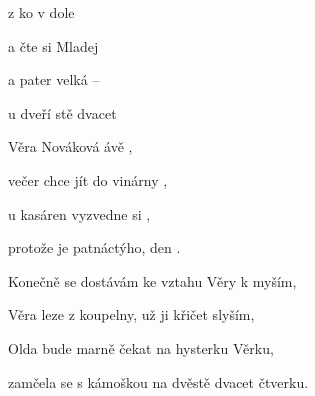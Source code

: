 

\zr
{} z  ko v  
dole 

a čte si  Mladej  

a   pater   velká --

u dveří  stě dvacet 
\kr

\zs
{} Věra Nováková ávě ,

večer chce jít do vinárny  ,

u kasáren vyzvedne si  ,

protože je patnáctýho,  den . 
\ks

\zr \kr

\zs
Konečně se dostávám ke vztahu Věry k myším,

Věra leze z koupelny, už ji křičet slyším,

Olda bude marně čekat na hysterku Věrku,

zamčela se s kámoškou na dvěstě dvacet čtverku.
\ks

\zr  \kr

\kp






